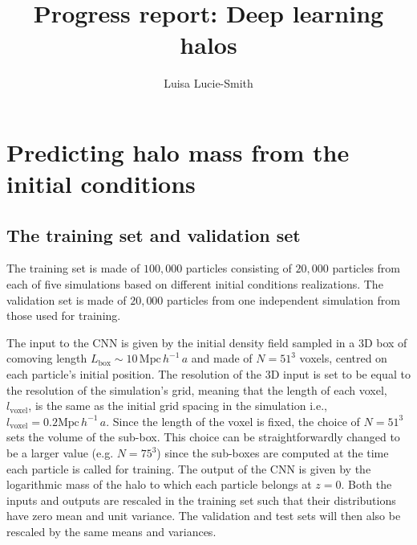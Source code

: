 \documentclass[11pt]{article}
\title{Progress report: Deep learning halos}
\author{Luisa Lucie-Smith}
\begin{document}
\maketitle

\section{Predicting halo mass from the initial conditions}

\subsection{The training set and validation set}

The training set is made of $100,000$ particles consisting of $20,000$ particles from each of five simulations based on different initial conditions realizations. The validation set is made of $20,000$ particles from one independent simulation from those used for training.

The input to the CNN is given by the initial density field sampled in a 3D box of comoving length $L_\mathrm{box} \sim 10 \, \mathrm{Mpc} \, h^{-1} \, a$ and made of $N = 51^{3}$ voxels, centred on each particle's initial position. The resolution of the 3D input is set to be equal to the resolution of the simulation's grid, meaning that the length of each voxel, $l_\mathrm{voxel}$, is the same as the initial grid spacing in the simulation i.e., $l_\mathrm{voxel} = 0.2 \mathrm{Mpc} \, h^{-1} \, a$. Since the length of the voxel is fixed, the choice of $N =51^3$ sets the volume of the sub-box. This choice can be straightforwardly changed to be a larger value (e.g. $N =75^3$) since the sub-boxes are computed at the time each particle is called for training. The output of the CNN is given by the logarithmic mass of the halo to which each particle belongs at $z=0$. Both the inputs and outputs are rescaled in the training set such that their distributions have zero mean and unit variance. The validation and test sets will then also be rescaled by the same means and variances.
\end{document}
